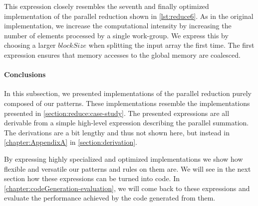 %
This expression closely resembles the seventh and finally optimized implementation of the parallel reduction shown in \autoref{lst:reduce6}.
As in the original \OpenCL implementation, we increase the computational intensity by increasing the number of elements processed by a single work-group.
We express this by choosing a larger $blockSize$ when splitting the input array the first time.
The first \reorderStride expression ensures that memory accesses to the global memory are coalesced.


\paragraph{Conclusions}
In this subsection, we presented implementations of the parallel reduction purely composed of our patterns.
These implementations resemble the \OpenCL implementations presented in \autoref{section:reduce:case-study}.
The presented expressions are all derivable from a simple high-level expression describing the parallel summation.
The derivations are a bit lengthy and thus not shown here, but instead in \autoref{chapter:AppendixA} in \autoref{section:derivation}.

By expressing highly specialized and optimized implementations we show how flexible and versatile our patterns and rules on them are.
We will see in the next section how these expressions can be turned into \OpenCL code.
In \autoref{chapter:codeGeneration-evaluation}, we will come back to these expressions and evaluate the performance achieved by the \OpenCL code generated from them.



















